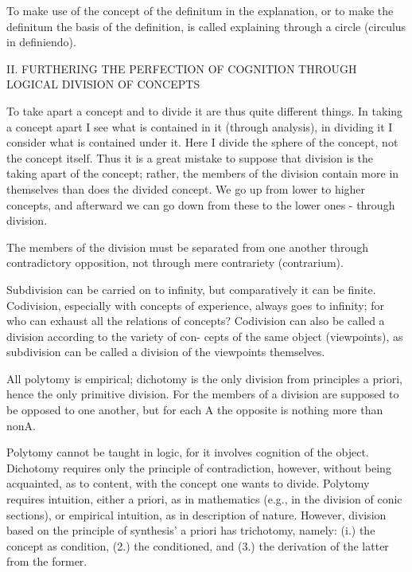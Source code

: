     To make use of the concept of the definitum in the explanation, or to
    make the definitum the basis of the definition, is called explaining through
    a circle (circulus in definiendo).

    II. FURTHERING THE PERFECTION OF COGNITION THROUGH LOGICAL DIVISION OF CONCEPTS

    To take apart a concept and to divide it are thus quite different things.
    In taking a concept apart I see what is contained in it (through analysis),
    in dividing it I consider what is contained under it.
    Here I divide the sphere of the concept, not the concept itself.
    Thus it is a great mistake to suppose that division is
    the taking apart of the concept;
    rather, the members of the division contain more in themselves
    than does the divided concept.
    We go up from lower to higher concepts, and afterward we can go down
    from these to the lower ones - through division.

    The members of the division must be separated from one another through
    contradictory opposition, not through mere contrariety (contrarium).

    Subdivision can be carried on to infinity, but comparatively it can be
    finite. Codivision, especially with concepts of experience, always goes to
    infinity; for who can exhaust all the relations of concepts?
    Codivision can also be called a division according to the variety of con-
    cepts of the same object (viewpoints), as subdivision can be called a
    division of the viewpoints themselves.

    All polytomy is empirical; dichotomy is the only division from principles a
    priori, hence the only primitive division. For the members of a division are
    supposed to be opposed to one another, but for each A the opposite is
    nothing more than nonA.

    Polytomy cannot be taught in logic, for it involves cognition of the object.
    Dichotomy requires only the principle of contradiction, however, without
    being acquainted, as to content, with the concept one wants to divide.
    Polytomy requires intuition, either a priori, as in mathematics (e.g., in the
    division of conic sections), or empirical intuition, as in description of
    nature. However, division based on the principle of synthesis' a priori has
    trichotomy, namely: (i.) the concept as condition, (2.) the conditioned,
    and (3.) the derivation of the latter from the former.

